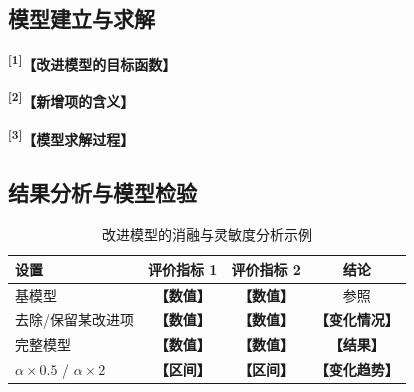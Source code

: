 \documentclass[UTF8,a4paper,12pt,fontset=fandol]{ctexart}
\newif\ifDraftAid
\newcommand{\ph}[1]{\textbf{\color{phg}【#1】}}
\newcommand{\detail}[1]{%
  \ifDraftAid\textnormal{\color{detailg}\small\,（参考写法：#1）}\fi}
\newcommand{\PHD}[2]{\ph{#1}\detail{#2}}
\newcommand{\SN}[1]{\textsuperscript{\color{noteg}\bfseries[#1]}}
\newcommand{\Note}[2]{\par\noindent\textbf{[#1]}\ #2}
\newcommand{\Annotated}[2]{%
\ifDraftAid
\noindent\begin{minipage}[t]{0.735\linewidth}\vspace{0pt}#1\end{minipage}\hfill
\begin{minipage}[t]{0.235\linewidth}\vspace{0pt}\footnotesize\color{noteg}\raggedright
\begin{tcolorbox}[colback=notebg,colframe=ruleg,boxrule=0.35pt,arc=1mm,left=1.2mm,right=1.2mm,top=1mm,bottom=1mm]
#2
\end{tcolorbox}\end{minipage}
\else
#1
\fi
}
\numberwithin{figure}{section}
\numberwithin{table}{section}
\begin{document}
\subsection{模型建立与求解}
\Annotated{
\SN{1}\PHD{改进模型的目标函数}{设问题二的基础损失为 $L_{\mathrm{base}}$，针对〔问题三新增要求〕增加 $L_{\mathrm{new}}$，则目标函数写为
\begin{equation}
\min_{\theta}\;J_{\mathrm{new}}(\theta)=L_{\mathrm{base}}+\alpha L_{\mathrm{new}}+\beta L_{\mathrm{robust}},
\label{eq:newobj}
\end{equation}
其中 $\alpha$ 和 $\beta$ 分别表示各部分损失的权重；若实际模型中没有相应项，可直接删去。通过调整各项之间的权重，可以使模型在〔原任务性能〕与〔新要求〕之间取得平衡。}

\par\medskip
\SN{2}\PHD{新增项的含义}{其中，$L_{\mathrm{new}}$ 用于度量〔对象A〕与〔对象B〕之间的〔差异或代价〕。该值越〔大/小〕表示〔实际含义〕，因此通过最小化该项可以使〔模型产生的具体变化〕，从而改善前述问题。相较于〔问题二模型〕，改进后模型的主要改动集中在〔新增部分〕，其余结构或求解步骤基本保持不变，以便比较改进前后的结果。}

\par\medskip
\SN{3}\PHD{模型求解过程}{模型采用〔优化算法〕进行训练或迭代求解，主要参数设置见表〔编号〕。训练过程中根据〔验证集损失或评价指标〕保存效果较好的模型；当〔达到最大轮数或指标连续若干轮不再改善〕时停止训练。}
}{
\Note{1}{改进模型要明确说明相较问题二模型增加或修改了哪一部分。}
\Note{2}{新增公式或损失项应说明其数学含义和实际作用。}
\Note{3}{训练轮数、停止条件和主要参数应给出。}
}

\subsection{结果分析与模型检验}
\begin{table}[H]
\centering\caption{改进模型的消融与灵敏度分析示例}\renewcommand{\arraystretch}{1.25}
\begin{tabular}{lccc}
\toprule 设置 & 评价指标 1 & 评价指标 2 & 结论\\ \midrule
基模型 & \ph{数值} & \ph{数值} & 参照\\
去除/保留某改进项 & \ph{数值} & \ph{数值} & \ph{变化情况}\\
完整模型 & \ph{数值} & \ph{数值} & \ph{结果}\\
$\alpha\times 0.5$ / $\alpha\times 2$ & \ph{区间} & \ph{区间} & \ph{变化趋势}\\ \bottomrule
\end{tabular}
\end{table}
\end{document}
